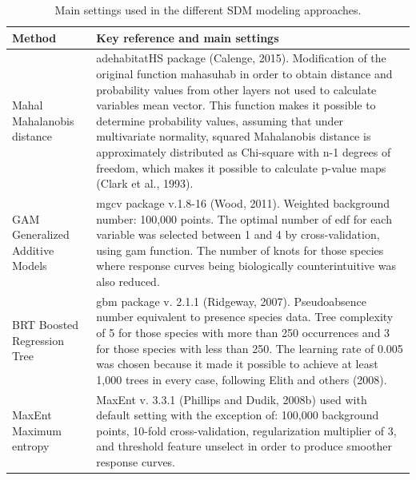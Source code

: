 \documentclass[11pt,twoside]{reedthesis}
\begin{document}
\begin{table}[H]

\caption[Main settings used in the different SDM modeling approaches.]{\label{tab:unnamed-chunk-1}Main settings used in the different SDM modeling approaches.}
\centering
\fontsize{8}{10}\selectfont
\begin{tabular}[t]{l>{\raggedright\arraybackslash}p{24em}}
\toprule
Method & Key reference and main settings\\
\midrule
Mahal Mahalanobis distance & adehabitatHS package (Calenge, 2015). Modification of the original function mahasuhab in order to obtain distance and probability values from other layers not used to calculate variables mean vector. This function makes it possible to determine probability values, assuming that under multivariate normality, squared Mahalanobis distance is approximately distributed as Chi-square with n-1 degrees of freedom, which makes it possible to calculate p-value maps (Clark et al., 1993).\\
GAM Generalized Additive Models & mgcv package v.1.8-16 (Wood, 2011). Weighted background number: 100,000 points. The optimal number of edf for each variable was selected between 1 and 4 by cross-validation, using gam function. The number of knots for those species where response curves being biologically counterintuitive was also reduced.\\
BRT Boosted Regression Tree & gbm package v. 2.1.1 (Ridgeway, 2007). Pseudoabsence number equivalent to presence species data. Tree complexity of 5 for those species with more than 250 occurrences and 3 for those species with less than 250. The learning rate of 0.005 was chosen because it made it possible to achieve at least 1,000 trees in every case, following Elith and others (2008).\\
MaxEnt Maximum entropy & MaxEnt v. 3.3.1 (Phillips and Dudik, 2008b) used with default setting with the exception of: 100,000 background points, 10-fold cross-validation, regularization multiplier of 3, and threshold feature unselect in order to produce smoother response curves.\\
\bottomrule
\end{tabular}
\end{table}
\end{document}
